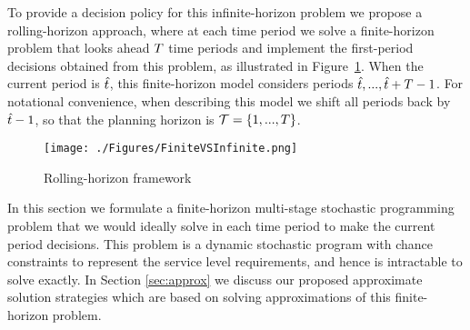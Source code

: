 \documentclass[msom]{oo}
\begin{document}
To provide a decision policy for this infinite-horizon problem we propose a rolling-horizon approach, where at each time period we solve a finite-horizon problem that looks ahead $T$ time periods and implement the first-period decisions obtained from this problem, as illustrated in Figure~\ref{fig:FiniteVSInfinite}. When the current period is $\hat{t}$, this finite-horizon model considers periods $\hat{t}, ..., \hat{t} +T -1$. For notational convenience, when describing this model we shift all periods back by $\hat{t}-1$, so that the planning horizon is $\mathcal{T}=\{1, ..., T\}$.

\begin{figure}[ht]
\begin{center}
\texttt{[image: ./Figures/FiniteVSInfinite.png]}
\caption{Rolling-horizon framework} 
\label{fig:FiniteVSInfinite}
\end{center}
\end{figure}

In this section we formulate a finite-horizon multi-stage stochastic programming problem that we would ideally solve in each time period to make the current period decisions. This problem is a dynamic stochastic program with chance constraints to represent the service level requirements, and hence is intractable to solve exactly. In Section \ref{sec:approx} we discuss our proposed approximate solution strategies which are based on solving approximations of this finite-horizon problem.
\end{document}
